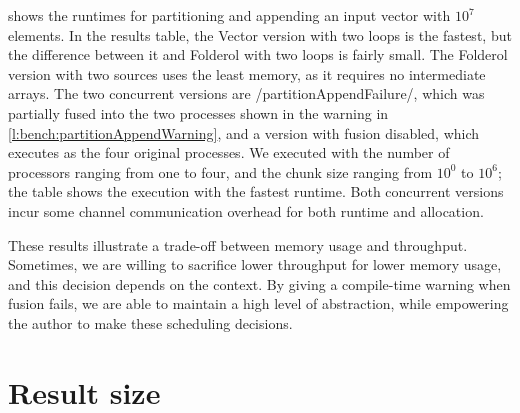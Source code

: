  shows the runtimes for partitioning and appending an input vector with $10^7$ elements.
In the results table, the Vector version with two loops is the fastest, but the difference between it and Folderol with two loops is fairly small.
The Folderol version with two sources uses the least memory, as it requires no intermediate arrays.
The two concurrent versions are \Hs/partitionAppendFailure/, which was partially fused into the two processes shown in the warning in \cref{l:bench:partitionAppendWarning}, and a version with fusion disabled, which executes as the four original processes.
We executed with the number of processors ranging from one to four, and the chunk size ranging from $10^0$ to $10^6$; the table shows the execution with the fastest runtime.
Both concurrent versions incur some channel communication overhead for both runtime and allocation.

These results illustrate a trade-off between memory usage and throughput.
Sometimes, we are willing to sacrifice lower throughput for lower memory usage, and this decision depends on the context.
By giving a compile-time warning when fusion fails, we are able to maintain a high level of abstraction, while empowering the author to make these scheduling decisions.

\section{Result size}

